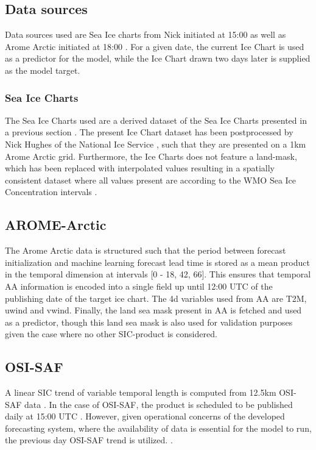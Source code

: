 \documentclass[../main/thesis]{subfiles}
\begin{document}
\subsection{Data sources}
Data sources used are Sea Ice charts from Nick initiated at 15:00 as well as Arome Arctic initiated at 18:00 \cite{Dinessen2020,Mueller2017}. For a given date, the current Ice Chart is used as a predictor for the model, while the Ice Chart drawn two days later is supplied as the model target.

\subsubsection{Sea Ice Charts}
The Sea Ice Charts used are a derived dataset of the Sea Ice Charts presented in a previous section . The present Ice Chart dataset has been postprocessed by Nick Hughes of the National Ice Service , such that they are presented on a 1km Arome Arctic grid. Furthermore, the Ice Charts does not feature a land-mask, which has been replaced with interpolated values resulting in a spatially consistent dataset where all values present are according to the WMO Sea Ice Concentration intervals \cite{JETSI2014}. 

\subsection{AROME-Arctic}
The Arome Arctic data is structured such that the period between forecast initialization and machine learning forecast lead time is stored as a mean product in the temporal dimension at intervals [0 - 18, 42, 66]. This ensures that temporal AA information is encoded into a single field up until 12:00 UTC of the publishing date of the target ice chart. The 4d variables used from AA are T2M, uwind and vwind. Finally, the land sea mask present in AA is fetched and used as a predictor, though this land sea mask is also used for validation purposes given the case where no other SIC-product is considered.

\subsection{OSI-SAF}
A linear SIC trend of variable temporal length is computed from 12.5km OSI-SAF data . In the case of OSI-SAF, the product is scheduled to be published daily at 15:00 UTC . However, given operational concerns of the developed forecasting system, where the availability of data is essential for the model to run, the previous day OSI-SAF trend is utilized. .
\end{document}

